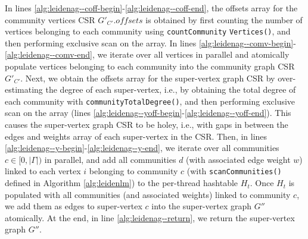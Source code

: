 In lines \ref{alg:leidenag--coff-begin}-\ref{alg:leidenag--coff-end}, the offsets array for the community vertices CSR $G'_{C'}.offsets$ is obtained by first counting the number of vertices belonging to each community using \texttt{countCommunity} \texttt{Vertices()}, and then performing exclusive scan on the array. In lines \ref{alg:leidenag--comv-begin}-\ref{alg:leidenag--comv-end}, we iterate over all vertices in parallel and atomically populate vertices belonging to each community into the community graph CSR $G'_{C'}$. Next, we obtain the offsets array for the super-vertex graph CSR by over-estimating the degree of each super-vertex, i.e., by obtaining the total degree of each community with \texttt{communityTotalDegree()}, and then performing exclusive scan on the array (lines \ref{alg:leidenag--yoff-begin}-\ref{alg:leidenag--yoff-end}). This causes the super-vertex graph CSR to be holey, i.e., with gaps in between the edges and weights array of each super-vertex in the CSR. Then, in lines \ref{alg:leidenag--y-begin}-\ref{alg:leidenag--y-end}, we iterate over all communities $c \in [0, |\Gamma|)$ in parallel, and add all communities $d$ (with associated edge weight $w$) linked to each vertex $i$ belonging to community $c$ (with \texttt{scanCommunities()} defined in Algorithm \ref{alg:leidenlm}) to the per-thread hashtable $H_t$. Once $H_t$ is populated with all communities (and associated weights) linked to community $c$, we add them as edges to super-vertex $c$ into the super-vertex graph $G''$ atomically. At the end, in line \ref{alg:leidenag--return}, we return the super-vertex graph $G''$.



